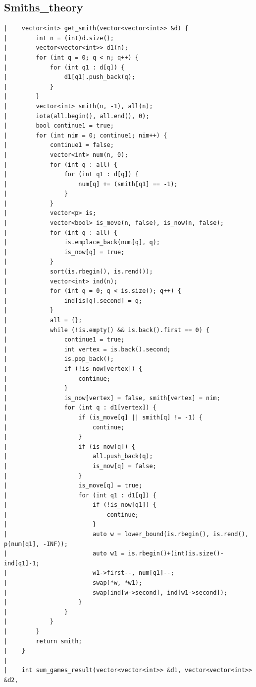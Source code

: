 \documentclass[a4paper, 10pt]{article}
\begin{document}
\begin{center}
\section*{Smiths\_theory}
\begin{verbatim}
|    vector<int> get_smith(vector<vector<int>> &d) {
|        int n = (int)d.size();
|        vector<vector<int>> d1(n);
|        for (int q = 0; q < n; q++) {
|            for (int q1 : d[q]) {
|                d1[q1].push_back(q);
|            }
|        }
|        vector<int> smith(n, -1), all(n);
|        iota(all.begin(), all.end(), 0);
|        bool continue1 = true;
|        for (int nim = 0; continue1; nim++) {
|            continue1 = false;
|            vector<int> num(n, 0);
|            for (int q : all) {
|                for (int q1 : d[q]) {
|                    num[q] += (smith[q1] == -1);
|                }
|            }
|            vector<p> is;
|            vector<bool> is_move(n, false), is_now(n, false);
|            for (int q : all) {
|                is.emplace_back(num[q], q);
|                is_now[q] = true;
|            }
|            sort(is.rbegin(), is.rend());
|            vector<int> ind(n);
|            for (int q = 0; q < is.size(); q++) {
|                ind[is[q].second] = q;
|            }
|            all = {};
|            while (!is.empty() && is.back().first == 0) {
|                continue1 = true;
|                int vertex = is.back().second;
|                is.pop_back();
|                if (!is_now[vertex]) {
|                    continue;
|                }
|                is_now[vertex] = false, smith[vertex] = nim;
|                for (int q : d1[vertex]) {
|                    if (is_move[q] || smith[q] != -1) {
|                        continue;
|                    }
|                    if (is_now[q]) {
|                        all.push_back(q);
|                        is_now[q] = false;
|                    }
|                    is_move[q] = true;
|                    for (int q1 : d1[q]) {
|                        if (!is_now[q1]) {
|                            continue;
|                        }
|                        auto w = lower_bound(is.rbegin(), is.rend(), p(num[q1], -INF));
|                        auto w1 = is.rbegin()+(int)is.size()-ind[q1]-1;
|                        w1->first--, num[q1]--;
|                        swap(*w, *w1);
|                        swap(ind[w->second], ind[w1->second]);
|                    }
|                }
|            }
|        }
|        return smith;
|    }
|    
|    int sum_games_result(vector<vector<int>> &d1, vector<vector<int>> &d2,

\end{verbatim}
\end{center}
\end{document}
